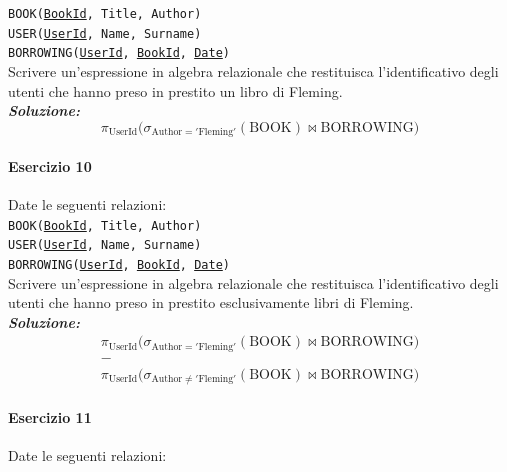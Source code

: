\documentclass[12pt]{extarticle}
\begin{document}
\noindent \texttt{BOOK(\underline{BookId}, Title, Author)}\\
\texttt{USER(\underline{UserId}, Name, Surname)}\\
\texttt{BORROWING(\underline{UserId}, \underline{BookId}, \underline{Date})}\\[0.5em]

\noindent Scrivere un'espressione in algebra relazionale che restituisca l'identificativo degli utenti che hanno preso in prestito un libro di Fleming.\\

\noindent \textbf{\textit{Soluzione:}}
\[
\pi_{\text{UserId}} \big( \sigma_{\text{Author} = '\text{Fleming}'}(\text{BOOK}) \bowtie \text{BORROWING} \big)
\]

\vspace{1em}

\paragraph{Esercizio 10} Date le seguenti relazioni:\\

\noindent \texttt{BOOK(\underline{BookId}, Title, Author)}\\
\texttt{USER(\underline{UserId}, Name, Surname)}\\
\texttt{BORROWING(\underline{UserId}, \underline{BookId}, \underline{Date})}\\[0.5em]

\noindent Scrivere un'espressione in algebra relazionale che restituisca l'identificativo degli utenti che hanno preso in prestito esclusivamente libri di Fleming.\\

\noindent \textbf{\textit{Soluzione:}}
\[
\begin{gathered}
\pi_{\text{UserId}} \big( \sigma_{\text{Author} = '\text{Fleming}'}(\text{BOOK}) \bowtie \text{BORROWING} \big) \\
- \\
\pi_{\text{UserId}} \big( \sigma_{\text{Author} \neq '\text{Fleming}'}(\text{BOOK}) \bowtie \text{BORROWING} \big)
\end{gathered}
\]

\vspace{1em}

\paragraph{Esercizio 11} Date le seguenti relazioni:\\
\end{document}
